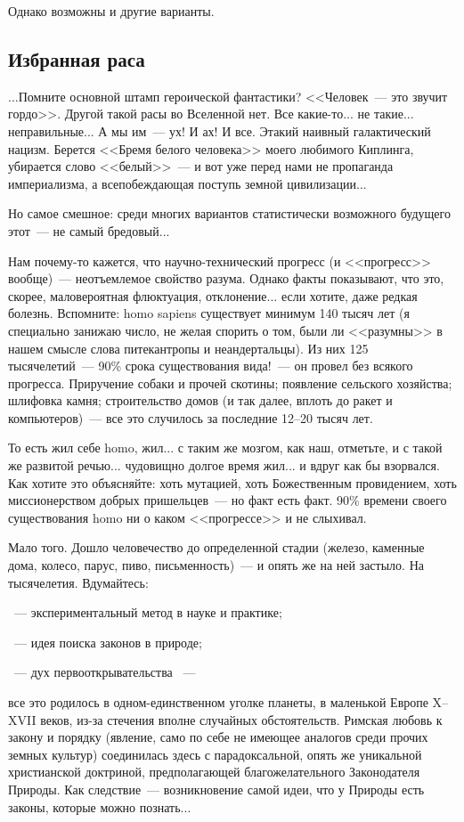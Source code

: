 \documentclass{scrbook}
\newcommand{\flqq}{<<}
\newcommand{\frqq}{>>}
\newcommand{\mdash}{~--- }
\newcommand{\ndash}{--}
\newcommand{\essaysection}[1]{\subsection*{#1}\nopagebreak}
\begin{document}
Однако возможны и другие варианты.

\essaysection{Избранная раса}

...Помните основной штамп героической фантастики? {\flqq}Человек{\mdash}это звучит гордо{\frqq}. Другой такой расы во Вселенной нет. Все какие-то... не такие... неправильные... А мы им{\mdash}ух! И ах! И все. Этакий наивный галактический нацизм. Берется {\flqq}Бремя белого человека{\frqq} моего любимого Киплинга, убирается слово {\flqq}белый{\frqq}{\mdash}и вот уже перед нами не пропаганда империализма, а всепобеждающая поступь земной цивилизации...

Но самое смешное: среди многих вариантов статистически возможного будущего этот{\mdash}не самый бредовый...

Нам почему-то кажется, что научно-технический прогресс (и {\flqq}прогресс{\frqq} вообще){\mdash}неотъемлемое свойство разума. Однако факты показывают, что это, скорее, маловероятная флюктуация, отклонение... если хотите, даже редкая болезнь. Вспомните: homo sapiens существует минимум 140 тысяч лет (я специально занижаю число, не желая спорить о том, были ли {\flqq}разумны{\frqq} в нашем смысле слова питекантропы и неандертальцы). Из них 125 тысячелетий{\mdash}90\% срока существования вида!{\mdash}он провел без всякого прогресса. Приручение собаки и прочей скотины; появление сельского хозяйства; шлифовка камня; строительство домов (и так далее, вплоть до ракет и компьютеров){\mdash}все это случилось за последние 12{\ndash}20 тысяч лет.

То есть жил себе homo, жил... с таким же мозгом, как наш, отметьте, и с такой же развитой речью... чудовищно долгое время жил... и вдруг как бы взорвался. Как хотите это объясняйте: хоть мутацией, хоть Божественным провидением, хоть миссионерством добрых пришельцев{\mdash}но факт есть факт. 90\% времени своего существования homo ни о каком {\flqq}прогрессе{\frqq} и не слыхивал.

Мало того. Дошло человечество до определенной стадии (железо, каменные дома, колесо, парус, пиво, письменность){\mdash}и опять же на ней застыло. На тысячелетия. Вдумайтесь:

{\mdash} экспериментальный метод в науке и практике;

{\mdash} идея поиска законов в природе;

{\mdash} дух первооткрывательства {\mdash}

все это родилось в одном-единственном уголке планеты, в маленькой Европе X{\ndash}XVII веков, из-за стечения вполне случайных обстоятельств. Римская любовь к закону и порядку (явление, само по себе не имеющее аналогов среди прочих земных культур) соединилась здесь с парадоксальной, опять же уникальной христианской доктриной, предполагающей благожелательного Законодателя Природы. Как следствие{\mdash}возникновение самой идеи, что у Природы есть законы, которые можно познать...
\end{document}
